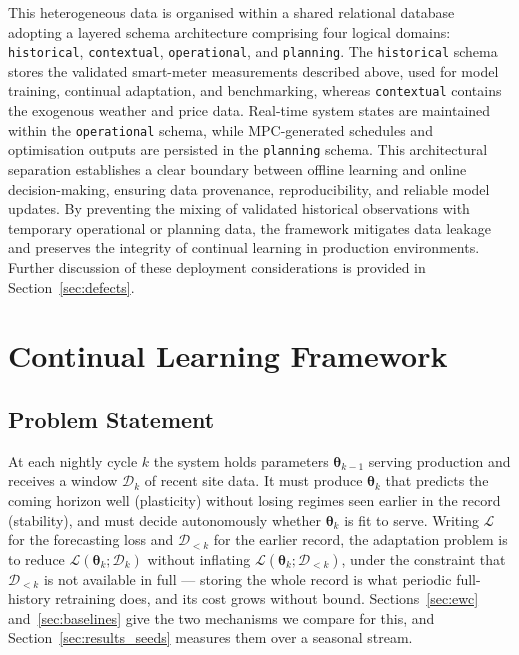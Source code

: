\documentclass[journal]{IEEEtran}
\newcommand{\loss}{\mathcal{L}}
\newcommand{\params}{\bm{\theta}}
\begin{document}
This heterogeneous data is organised within a shared relational
database adopting a layered schema architecture comprising four
logical domains: \texttt{historical}, \texttt{contextual},
\texttt{operational}, and \texttt{planning}. The \texttt{historical}
schema stores the validated smart-meter measurements described above,
used for model training, continual adaptation, and benchmarking,
whereas \texttt{contextual} contains the exogenous weather and price
data. Real-time system states are maintained within the
\texttt{operational} schema, while MPC-generated schedules and
optimisation outputs are persisted in the \texttt{planning} schema.
This architectural separation establishes a clear boundary between
offline learning and online decision-making, ensuring data provenance,
reproducibility, and reliable model updates. By preventing the mixing
of validated historical observations with temporary operational or
planning data, the framework mitigates data leakage and preserves the
integrity of continual learning in production environments. Further
discussion of these deployment considerations is provided in
Section~\ref{sec:defects}.
\section{Continual Learning Framework}
\label{sec:clframework}

\subsection{Problem Statement}
\label{sec:problem}
At each nightly cycle $k$ the system holds parameters $\params_{k-1}$ serving
production and receives a window $\mathcal{D}_k$ of recent site data. It must
produce $\params_k$ that predicts the coming horizon well (plasticity) without
losing regimes seen earlier in the record (stability), and must decide
autonomously whether $\params_k$ is fit to serve. Writing $\loss$ for the
forecasting loss and $\mathcal{D}_{<k}$ for the earlier record, the adaptation
problem is to reduce $\loss(\params_k; \mathcal{D}_k)$ without inflating
$\loss(\params_k; \mathcal{D}_{<k})$, under the constraint that
$\mathcal{D}_{<k}$ is not available in full --- storing the whole record is
what periodic full-history retraining does, and its cost grows without bound.
Sections~\ref{sec:ewc} and~\ref{sec:baselines} give the two mechanisms we
compare for this, and Section~\ref{sec:results_seeds} measures them over a
seasonal stream.
\end{document}
